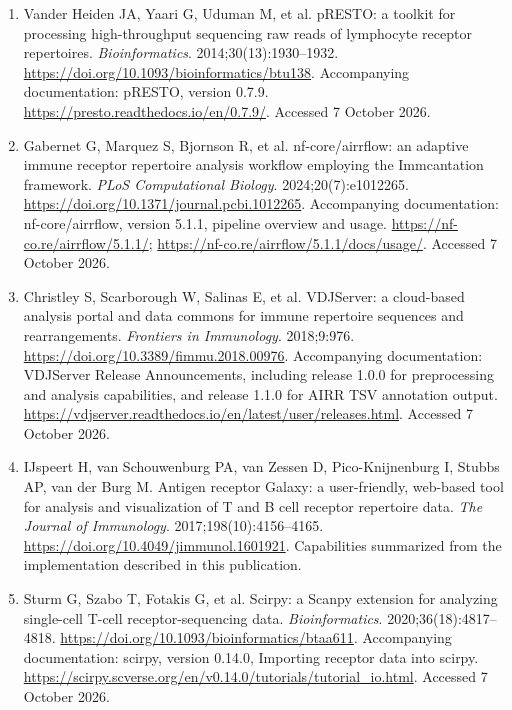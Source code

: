 \documentclass[11pt]{article}
\begin{document}
\begin{landscape}
\begin{enumerate}
\setlength{\itemsep}{2pt}

\item Vander Heiden JA, Yaari G, Uduman M, et al.
pRESTO: a toolkit for processing high-throughput sequencing
raw reads of lymphocyte receptor repertoires.
\textit{Bioinformatics}. 2014;30(13):1930--1932.
\url{https://doi.org/10.1093/bioinformatics/btu138}.
Accompanying documentation: pRESTO, version 0.7.9.
\url{https://presto.readthedocs.io/en/0.7.9/}.
Accessed 7 October 2026.

\item Gabernet G, Marquez S, Bjornson R, et al.
nf-core/airrflow: an adaptive immune receptor repertoire
analysis workflow employing the Immcantation framework.
\textit{PLoS Computational Biology}. 2024;20(7):e1012265.
\url{https://doi.org/10.1371/journal.pcbi.1012265}.
Accompanying documentation: nf-core/airrflow, version 5.1.1,
pipeline overview and usage.
\url{https://nf-co.re/airrflow/5.1.1/};
\url{https://nf-co.re/airrflow/5.1.1/docs/usage/}.
Accessed 7 October 2026.

\item Christley S, Scarborough W, Salinas E, et al.
VDJServer: a cloud-based analysis portal and data commons
for immune repertoire sequences and rearrangements.
\textit{Frontiers in Immunology}. 2018;9:976.
\url{https://doi.org/10.3389/fimmu.2018.00976}.
Accompanying documentation: VDJServer Release Announcements,
including release 1.0.0 for preprocessing and analysis
capabilities, and release 1.1.0 for AIRR TSV annotation output.
\url{https://vdjserver.readthedocs.io/en/latest/user/releases.html}.
Accessed 7 October 2026.

\item IJspeert H, van Schouwenburg PA, van Zessen D,
Pico-Knijnenburg I, Stubbs AP, van der Burg M.
Antigen receptor Galaxy: a user-friendly, web-based tool
for analysis and visualization of T and B cell receptor
repertoire data.
\textit{The Journal of Immunology}. 2017;198(10):4156--4165.
\url{https://doi.org/10.4049/jimmunol.1601921}.
Capabilities summarized from the implementation described
in this publication.

\item Sturm G, Szabo T, Fotakis G, et al.
Scirpy: a Scanpy extension for analyzing single-cell
T-cell receptor-sequencing data.
\textit{Bioinformatics}. 2020;36(18):4817--4818.
\url{https://doi.org/10.1093/bioinformatics/btaa611}.
Accompanying documentation: scirpy, version 0.14.0,
Importing receptor data into scirpy.
\url{https://scirpy.scverse.org/en/v0.14.0/tutorials/tutorial_io.html}.
Accessed 7 October 2026.

\end{enumerate}
\end{landscape}
\end{document}
